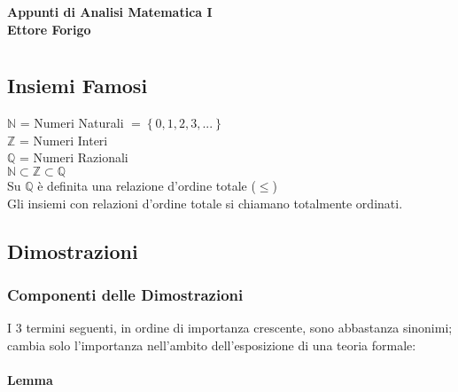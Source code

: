 \documentclass[a4paper, twoside, italian, 11pt]{book}
\newcommand{\braces}[1] {\left\{#1\right\}}
\newcommand{\N}{\mathbb{N}}
\newcommand{\Z}{\mathbb{Z}}
\newcommand{\Q}{\mathbb{Q}}
\begin{document}
\pagestyle{headings}

\frontmatter

\begin{titlepage}
	\begin{center}
		{\huge \bfseries Appunti di Analisi Matematica I\\}
		\vspace{1.5cm}
		{\Large \bfseries Ettore Forigo}
	\end{center}
\end{titlepage}

\mainmatter

\chapter{}



\section{Insiemi Famosi}

\noindent
$\N$ = Numeri Naturali $= \braces{0, 1, 2, 3, ...}$ \\
$\Z$ = Numeri Interi \\
$\Q$ = Numeri Razionali \\

\noindent
$\N \subset \Z \subset \Q$ \\

\noindent
Su $\Q$ è definita una relazione d'ordine totale  ($\leq$) \\

\noindent
Gli insiemi con relazioni d'ordine totale si chiamano totalmente ordinati.



\section{Dimostrazioni}


\subsection{Componenti delle Dimostrazioni}

\noindent
I 3 termini seguenti, in ordine di importanza crescente, sono abbastanza sinonimi; cambia solo l'importanza nell'ambito dell'esposizione di una teoria formale:


\subsubsection{Lemma}
\end{document}

